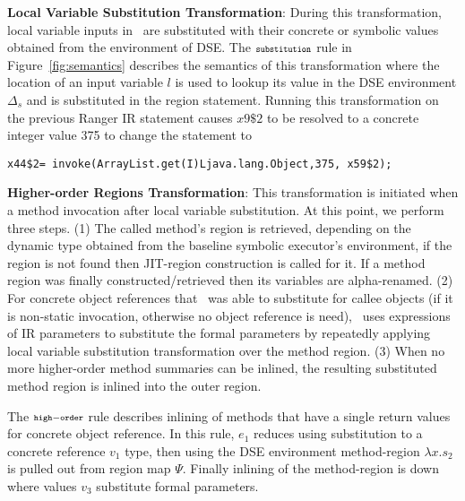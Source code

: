 \textbf{Local Variable Substitution Transformation}: During this transformation, local variable inputs in \toolshort\ are substituted with their concrete or symbolic values obtained from the environment of DSE.
%
The $\scriptstyle\mathtt{substitution}$ rule in Figure~\ref{fig:semantics} describes the semantics of this transformation where the location of an input variable $l$ is used to lookup its value in the DSE environment $\Delta_s$ and is substituted in the region statement.
%
Running this transformation on the previous Ranger IR statement causes $x9\$2$ to be
resolved to a concrete integer value 375 to change the statement to %
\begin{lstlisting}[numbers=none]
x44$2= invoke(ArrayList.get(I)Ljava.lang.Object,375, x59$2);
\end{lstlisting}
%
\textbf{Higher-order Regions Transformation}: This transformation is initiated when a method invocation after local variable substitution.
%
At this point, we perform three steps.
%
(1) The called method\rq s region is retrieved, depending on the dynamic type obtained from the baseline symbolic
executor\rq s environment, if the region is not found then JIT-region construction is called for it. If a method region
was finally constructed/retrieved then its variables are alpha-renamed.
%
(2) For concrete object references that \toolshort\ was able to substitute for callee objects (if it is non-static
invocation, otherwise no object reference is need), \toolshort\ uses expressions of IR parameters to substitute the
formal parameters by repeatedly applying local variable substitution transformation over the method region.
%
(3) When no more higher-order method summaries can be inlined, the resulting substituted method region is inlined into
the outer region.
%

The $\scriptstyle\mathtt{high-order}$ rule describes inlining of methods that have a single return values for concrete
object reference. In this rule, $e_1$ reduces using substitution to a concrete reference $v_1$ type, then using the DSE environment method-region $\lambda x.s_2$ is pulled out from region map $\Psi$. Finally inlining of the method-region is down where values $v_3$ substitute formal parameters.

